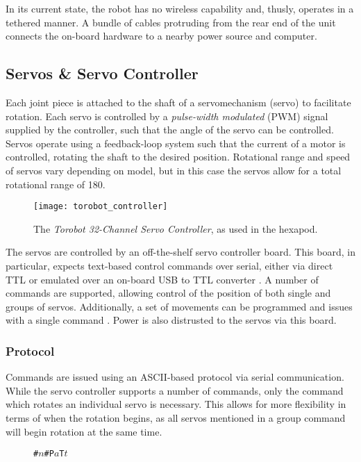 {In its current state, the robot has no wireless capability and, thusly, operates in a tethered manner. A bundle of cables protruding from the rear end of the unit connects the on-board hardware to a nearby power source and computer.

\subsection{Servos \& Servo Controller}
Each joint piece is attached to the shaft of a servomechanism (servo) to facilitate rotation. Each servo is controlled by a \emph{pulse-width modulated} (PWM) signal supplied by the controller, such that the angle of the servo can be controlled. Servos operate using a feedback-loop system such that the current of a motor is controlled, rotating the shaft to the desired position. Rotational range and speed of servos vary depending on model, but in this case the servos allow for a total rotational range of 180\textdegree.

\begin{figure}[h]
    \centering
    \texttt{[image: torobot\_controller]}
    \caption{The \emph{Torobot 32-Channel Servo Controller}, as used in the hexapod.}
    \label{fig:torobot_controller}
\end{figure}

The servos are controlled by an off-the-shelf servo controller board. This board, in particular, expects text-based control commands over serial, either via direct TTL or emulated over an on-board USB to TTL converter \cite{torobot_manual}. A number of commands are supported, allowing control of the position of both single and groups of servos. Additionally, a set of movements can be programmed and issues with a single command \cite{torobot_manual}. Power is also distrusted to the servos via this board.

\subsubsection{Protocol}

Commands are issued using an ASCII-based protocol via serial communication. While the servo controller supports a number of commands, only the command which rotates an individual servo is necessary. This allows for more flexibility in terms of when the rotation begins, as all servos mentioned in a group command will begin rotation at the same time.

\begin{figure}[!h]
    \centering
    \texttt{\#\(n\)\#P\(a\)T\(t\)}
\end{figure}

}
